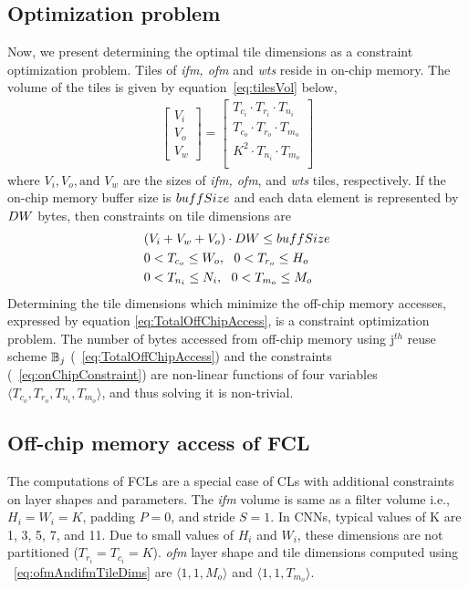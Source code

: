 \subsection{Optimization problem}
Now, we present determining the optimal tile dimensions as a constraint optimization problem. Tiles of \textit{ifm, ofm} and \textit{wts} reside in on-chip memory. The volume of the tiles is given by equation~\eqref{eq:tilesVol} below,
\begin{align}\label{eq:tilesVol}
	\begin{bmatrix}
		V_i \\ V_o \\ V_w
	\end{bmatrix}=
	\begin{bmatrix}
		T_{c_i}\cdot T_{r_i}\cdot T_{n_i}\\
		T_{c_o}\cdot T_{r_o}\cdot T_{m_o}\\
		K^2\cdot T_{n_i}\cdot T_{m_o}\\
	\end{bmatrix}
\end{align}
where $V_i, V_o, \text{and }V_w$ are the sizes of \textit{ifm, ofm}, and \textit{wts} tiles, respectively. If the on-chip memory buffer size is $buffSize$ and each data element is represented by $DW$ bytes, then constraints on tile dimensions are
\begin{align}\label{eq:onChipConstraint}
	\begin{split}
		&(V_i + V_w + V_o)\cdot DW\leq buffSize \\
		&0<T_{c_o}\leq W_o,~\ 0<T_{r_o}\leq H_o\\
		&0<T_{n_i}\leq N_i,~\ 0<T_{m_o}\leq M_o
	\end{split}
\end{align}
Determining the tile dimensions which minimize the off-chip memory accesses, expressed by equation \eqref{eq:TotalOffChipAccess}, is a constraint optimization problem. The  number of bytes accessed from off-chip memory using j$^{th}$ reuse scheme $\mathbb{B}_j$ (~\eqref{eq:TotalOffChipAccess}) and the constraints (~\eqref{eq:onChipConstraint}) are non-linear functions of four variables $\langle T_{c_o},T_{r_o},T_{n_i},T_{m_o}\rangle$, and thus solving it is non-trivial.
\subsection{Off-chip memory access of FCL}\label{sec:AccessFCLData}
The computations of FCLs are a special case of CLs with additional constraints on layer shapes and parameters. The \textit{ifm} volume is same as a filter volume i.e., $H_i{=}W_i{=}K$, padding $P{=}0$, and stride $S{=}1$. In CNNs, typical values of K are 1, 3, 5, 7, and 11. Due to small values of $H_i$ and $W_i$, these dimensions are not partitioned ($T_{r_i}{=}T_{c_i}{=}K$). \textit{ofm} layer shape and tile dimensions computed using ~\eqref{eq:ofmAndifmTileDims} are $\langle 1,1,M_o\rangle$ and $\langle 1,1,T_{m_o}\rangle$.

